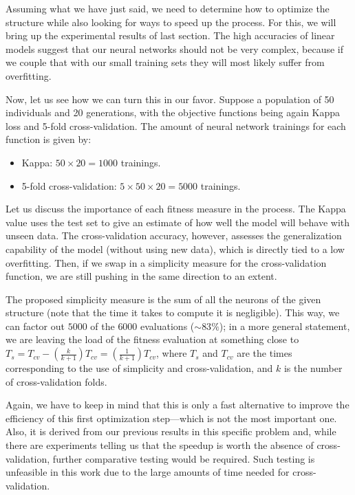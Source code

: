 	Assuming what we have just said, we need to determine how to optimize the structure while also looking for ways to speed up the process. For this, we will bring up the experimental results of last section. The high accuracies of linear models suggest that our neural networks should not be very complex, because if we couple that with our small training sets they will most likely suffer from overfitting.

\newpage

	Now, let us see how we can turn this in our favor. Suppose a population of 50 individuals and 20 generations, with the objective functions being again Kappa loss and 5-fold cross-validation. The amount of neural network trainings for each function is given by:

	\begin{itemize}

		\item
		Kappa: $50 \times 20 = 1000$ trainings.

		\item
		5-fold cross-validation: $5 \times 50 \times 20 = 5000$ trainings.

	\end{itemize}

	Let us discuss the importance of each fitness measure in the process. The Kappa value uses the test set to give an estimate of how well the model will behave with unseen data. The cross-validation accuracy, however, assesses the generalization capability of the model (without using new data), which is directly tied to a low overfitting. Then, if we swap in a simplicity measure for the cross-validation function, we are still pushing in the same direction to an extent.

	The proposed simplicity measure is the sum of all the neurons of the given structure (note that the time it takes to compute it is negligible). This way, we can factor out $5000$ of the $6000$ evaluations ($\sim83\%$); in a more general statement, we are leaving the load of the fitness evaluation at something close to $T_s = T_{cv} -(\frac{k}{k+1})T_{cv} = (\frac{1}{k+1})T_{cv}$, where $T_s$ and $T_{cv}$ are the times corresponding to the use of simplicity and cross-validation, and $k$ is the number of cross-validation folds.

	Again, we have to keep in mind that this is only a fast alternative to improve the efficiency of this first optimization step---which is not the most important one. Also, it is derived from our previous results in this specific problem and, while there are experiments telling us that the speedup is worth the absence of cross-validation, further comparative testing would be required. Such testing is unfeasible in this work due to the large amounts of time needed for cross-validation.

